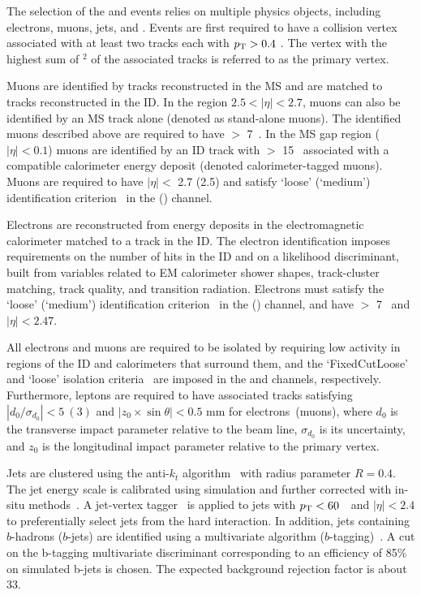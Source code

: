 The selection of the \lllljj and \llvvjj events relies on multiple physics objects, including electrons, muons, jets, and \met.
Events are first required to have a collision vertex associated with at least two tracks each with $p_{\text{T}}>0.4$ \GeV.
The vertex with the highest sum of \pt{}$^{2}$ of the associated tracks is referred to as the primary vertex.

Muons are identified by tracks reconstructed in the MS and are matched to tracks reconstructed in the ID. In the region $2.5<|\eta|<2.7$, muons can also be identified by an MS track alone (denoted as stand-alone muons).
The identified muons described above are required to have \pT{} $>$ 7~\GeV{}.
In the MS gap region ($|\eta|<0.1$) muons are identified by an ID track with \pT{} $>$ 15~\GeV{}
associated with a compatible calorimeter energy deposit (denoted calorimeter-tagged muons).
Muons are required to have $|\eta| <$ 2.7 (2.5) and satisfy `loose' (`medium') identification criterion~\cite{PERF-2015-10} in the \lllljj (\llvvjj) channel. 

Electrons are reconstructed from energy deposits in the electromagnetic calorimeter matched to a track in the ID.
The electron identification imposes requirements on the number of hits in the ID and on a likelihood discriminant,
built from variables related to EM calorimeter shower shapes, track-cluster matching, track quality, and transition radiation.
Electrons must satisfy the `loose' (`medium') identification criterion~\cite{Aaboud:2019ynx} in the \lllljj (\llvvjj) channel, and have \pT{} $>$ 7~\GeV{} and $|\eta| < 2.47$.

All electrons and muons are required to be isolated by requiring low activity in regions of the ID and calorimeters that surround them,
and the `FixedCutLoose' and `loose' isolation criteria~\cite{PERF-2015-10,Aaboud:2019ynx} are imposed in the \lllljj and \llvvjj channels, respectively. Furthermore, leptons are required to have associated tracks satisfying $|d_0/\sigma_{d_0}|<5~(3)$ and $|z_0\times\sin\theta|<0.5$ mm for electrons~(muons), where $d_0$ is the transverse impact parameter relative to the beam line, $\sigma_{d_0}$ is its uncertainty, and $z_0$ is the longitudinal impact parameter relative to the primary vertex.

Jets are clustered using the anti-$k_t$ algorithm~\cite{antikt_algorithm,Fastjet} with radius parameter $R = 0.4$. The jet energy scale is calibrated using simulation and further corrected with in-situ methods~\cite{Aaboud:2017jcu}. 
A jet-vertex tagger~\cite{PERF-2014-03} is applied to jets with $p_{\text{T}}<60$~\GeV\ and $|\eta|<2.4$ to preferentially select jets from the hard interaction. In addition, jets containing $b$-hadrons ($b$-jets) are identified using a multivariate algorithm ($b$-tagging)~\cite{bjets}.
A cut on the b-tagging multivariate discriminant corresponding to an efficiency of 85\% on simulated b-jets is chosen. The expected background rejection factor is about 33.

